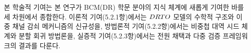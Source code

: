 
\section{}
\label{sec:academic-contrib}

\begin{p5add}
본 학술적 기여는 본 연구가 BCM(DR) 학문 분야의
지식 체계에 새롭게 기여한 바를  세 차원에서
종합한다. 이론적 기여(5.2.1항)에서는 $DRTO$ 모델의 수학적 구조와
이중 채널 감쇠 메커니즘의 신규성을, 방법론적 기여(5.2.2항)에서는 비중첩
대역 시드 체계와 분할 회귀 방법론을, 실증적 기여(5.2.3항)에서는  전원 채택과 다중 검증 프레임워크의 결과를 다룬다.
\end{p5add}

\subsection{}
\label{subsec:academic-theoretical}

\begingroup
  \renewcommand{\section}[1]{}
  \renewcommand{\subsection}[1]{}
  \renewcommand{\subsubsection}[1]{\paragraph{#1}}


